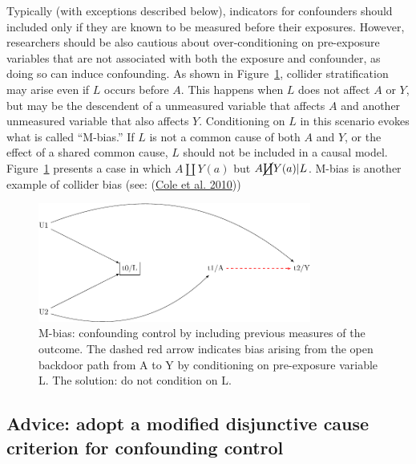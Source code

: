 \documentclass[
  singlecolumn]{report}
\begin{document}
Typically (with exceptions described below), indicators for confounders
should included only if they are known to be measured before their
exposures. However, researchers should be also cautious about
over-conditioning on pre-exposure variables that are not associated with
both the exposure and confounder, as doing so can induce confounding. As
shown in Figure~\ref{fig-m-bias}, collider stratification may arise even
if \(L\) occurs before \(A\). This happens when \(L\) does not affect
\(A\) or \(Y\), but may be the descendent of a unmeasured variable that
affects \(A\) and another unmeasured variable that also affects \(Y\).
Conditioning on \(L\) in this scenario evokes what is called ``M-bias.''
If \(L\) is not a common cause of both \(A\) and \(Y\), or the effect of
a shared common cause, \(L\) should not be included in a causal model.
Figure~\ref{fig-m-bias} presents a case in which \(A \coprod Y(a)\) but
\(A \cancel{\coprod} Y(a)| L\). M-bias is another example of collider
bias (see: (\protect\hyperlink{ref-cole2010}{Cole et al. 2010}))

\begin{figure}

{\centering \includegraphics[width=0.8\textwidth,height=\textheight]{causal-dags_files/figure-pdf/fig-m-bias-1.pdf}

}

\caption{\label{fig-m-bias}M-bias: confounding control by including
previous measures of the outcome. The dashed red arrow indicates bias
arising from the open backdoor path from A to Y by conditioning on
pre-exposure variable L. The solution: do not condition on L.}

\end{figure}

\hypertarget{advice-adopt-a-modified-disjunctive-cause-criterion-for-confounding-control}{%
\subsection{Advice: adopt a modified disjunctive cause criterion for
confounding
control}\label{advice-adopt-a-modified-disjunctive-cause-criterion-for-confounding-control}}
\end{document}
